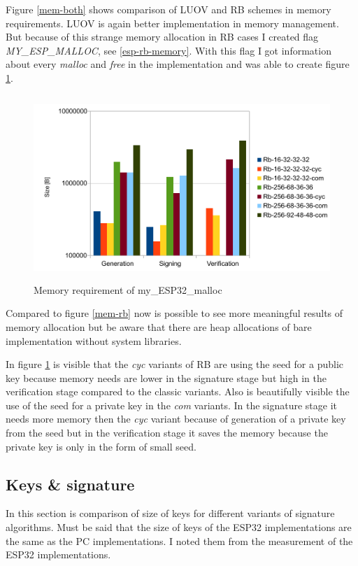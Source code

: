 \documentclass[thesis=M,english]{FITthesis}[2019/12/23]
\begin{document}
\noindent
Figure \ref{mem-both} shows comparison of LUOV and RB schemes in memory requirements. LUOV is again better implementation in memory management. But because of this strange memory allocation in RB cases I created flag \textit{MY\_ESP\_MALLOC}, see \ref{esp-rb-memory}. With this flag I got information about every \textit{malloc} and \textit{free} in the implementation and was able to create figure \ref{mem-my-alloc}.

\begin{figure}[H]
\centering
\includegraphics[width=13cm,height=7cm]{images/mem-my_esp_malloc.pdf}
\caption{Memory requirement of my\_ESP32\_malloc}
\label{mem-my-alloc}
\end{figure}

\noindent
Compared to figure \ref{mem-rb} now is possible to see more meaningful results of memory allocation but be aware that there are heap allocations of bare implementation without system libraries.

\bigskip
\noindent
In figure \ref{mem-my-alloc} is visible that the \textit{cyc} variants of RB are using the seed for a public key because memory needs are lower in the signature stage but high in the verification stage compared to the classic variants. Also is beautifully visible the use of the seed for a private key in the \textit{com} variants. In the signature stage it needs more memory then the \textit{cyc} variant because of generation of a private key from the seed but in the verification stage it saves the memory because the private key is only in the form of small seed.

\subsection{Keys \& signature} \label{key_sign}
In this section is comparison of size of keys for different variants of signature algorithms. Must be said that the size of keys of the ESP32 implementations are the same as the PC implementations. I noted them from the measurement of the ESP32 implementations.
\end{document}
